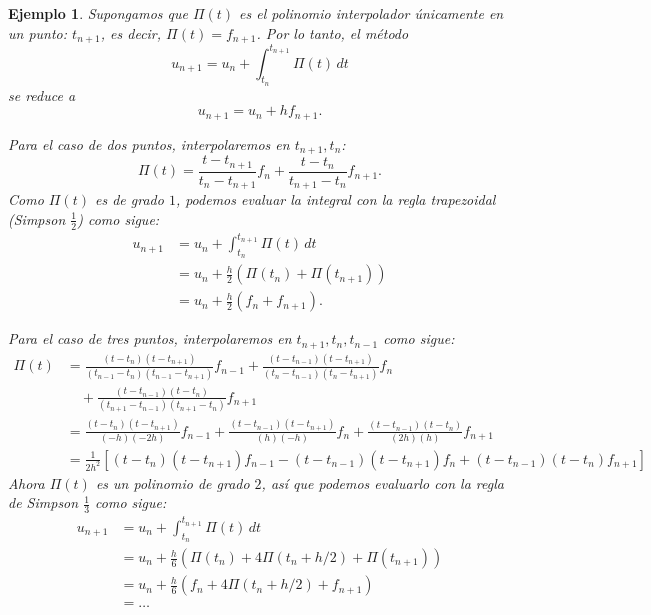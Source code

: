 \documentclass[11pt,letterpaper]{report}
\newtheorem{example}{Ejemplo}
\begin{document}
\begin{example}
  Supongamos que $\Pi(t)$ es el polinomio interpolador únicamente en
  un punto: $t_{n+1}$, es decir, $\Pi(t)=f_{n+1}$.
  Por lo tanto, el método
  \begin{equation}
    u_{n+1} = u_n + \int_{t_n}^{t_{n+1}} \Pi(t) \,dt
  \end{equation}
  se reduce a
  \begin{equation}
    u_{n+1} = u_n + hf_{n+1}.
  \end{equation}

  Para el caso de dos puntos, interpolaremos en $t_{n+1},t_n$:
   \begin{equation}
    \Pi(t)
    = \frac{t-t_{n+1}}{t_{n}-t_{n+1}}f_n
    + \frac{t-t_n}{t_{n+1}-t_n}f_{n+1}
  .\end{equation}
  Como $\Pi(t)$ es de grado $1$, podemos evaluar la integral con la
  regla trapezoidal (Simpson $\frac{1}{2}$) como sigue:
  \begin{align}
    u_{n+1}
    &= u_n + \int_{t_n}^{t_{n+1}} \Pi(t) \,dt \\
    &= u_{n} + \frac{h}{2}(\Pi(t_{n})+\Pi(t_{n+1})) \\
    &= u_{n} + \frac{h}{2}(f_{n}+f_{n+1}).
  \end{align}

  Para el caso de tres puntos, interpolaremos en $t_{n+1},t_n,t_{n-1}$ 
  como sigue:
  \begin{equation}
    \begin{split}
      \Pi(t)
      &=
      \frac{(t-t_{n})(t-t_{n+1})}{(t_{n-1}-t_n)(t_{n-1}-t_{n+1})}
      f_{n-1}
      +
      \frac{(t-t_{n-1})(t-t_{n+1})}{(t_{n}-t_{n-1})(t_{n}-t_{n+1})}
      f_{n}
      \\
      &\quad +
      \frac{(t-t_{n-1})(t-t_{n})}{(t_{n+1}-t_{n-1})(t_{n+1}-t_{n})}
      f_{n+1}
      \\
      &=
      \frac{(t-t_{n})(t-t_{n+1})}{(-h)(-2h)}
      f_{n-1}
      +
      \frac{(t-t_{n-1})(t-t_{n+1})}{(h)(-h)}
      f_{n}
      +
      \frac{(t-t_{n-1})(t-t_{n})}{(2h)(h)}
      f_{n+1}
      \\
      &=
      \frac{1}{2h^{2}}
      \left[
        (t-t_{n})(t-t_{n+1}) f_{n-1}
        - (t-t_{n-1})(t-t_{n+1}) f_{n}
        + (t-t_{n-1})(t-t_{n}) f_{n+1}
      \right]
    \end{split}
  \end{equation}
  Ahora $\Pi(t)$ es un polinomio de grado $2$, así que podemos
  evaluarlo con la regla de Simpson $\frac{1}{3}$ como sigue:
  \begin{align}
    u_{n+1}
    &= u_n + \int_{t_n}^{t_{n+1}} \Pi(t) \,dt \\
    &= u_{n}
    + \frac{h}{6}(\Pi(t_{n})+4\Pi(t_n + h / 2)+\Pi(t_{n+1})) \\
    &= u_{n}
    + \frac{h}{6}(f_{n}+4\Pi(t_n + h / 2)+f_{n+1}) \\
    &= \dots
  \end{align}
\end{example}
\end{document}
